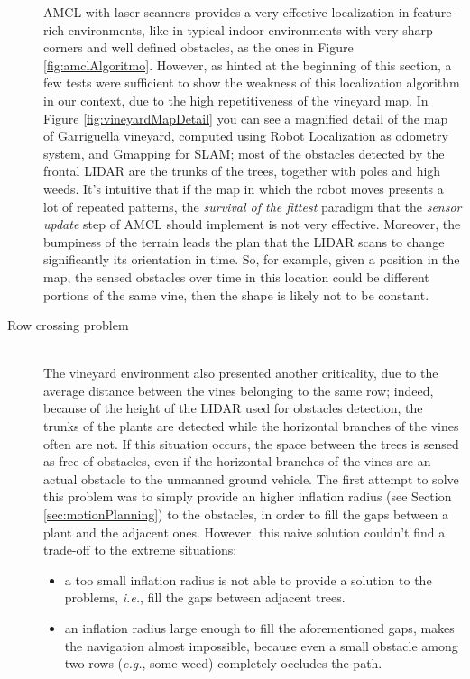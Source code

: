 \begin{description}
\ac{AMCL} with laser scanners provides a very effective localization in feature-rich environments, like in typical indoor environments with very sharp corners and well defined obstacles, as the ones in Figure \ref{fig:amclAlgoritmo}.
However, as hinted at the beginning of this section, a few tests were sufficient to show the weakness of this localization algorithm in our context, due to the high repetitiveness of the vineyard map. In Figure \ref{fig:vineyardMapDetail} you can see a magnified detail of the map of Garriguella vineyard, computed using Robot Localization as odometry system, and Gmapping for \ac{SLAM}; most of the obstacles detected by the frontal \ac{LIDAR} are the trunks of the trees, together with poles and high weeds.
 It's intuitive that if the map in which the robot moves presents a lot of repeated patterns, the \textit{survival of the fittest} paradigm that the \textit{sensor update} step of \ac{AMCL} should implement is not very effective. Moreover, the bumpiness of the terrain leads the plan that the \ac{LIDAR} scans to change significantly its orientation in time. So, for example, given a position in the map, the sensed obstacles over time in this location could be different portions of the same vine, then the shape is likely not to be constant.

\item[Row crossing problem] \hfill \\
The vineyard environment also presented another criticality, due to the average distance between the vines belonging to the same row; indeed, because of the height of the \ac{LIDAR} used for obstacles detection, the trunks of the plants are detected while the horizontal branches of the vines often are not.
If this situation occurs, the space between the trees is sensed as free of obstacles, even if the horizontal branches of the vines are an actual obstacle to the unmanned ground vehicle. The first attempt to solve this problem was to simply provide an higher inflation radius (see Section \ref{sec:motionPlanning}) to the obstacles, in order to fill the gaps between a plant and the adjacent ones. However, this naive solution couldn't find a trade-off to the extreme situations:
\begin{itemize}
	\item a too small inflation radius is not able to provide a solution to the problems, \textit{i.e.}, fill the gaps between adjacent trees.
	\item an inflation radius large enough to fill the aforementioned gaps, makes the navigation almost impossible, because even a small obstacle among two rows (\textit{e.g.}, some weed) completely occludes the path.
\end{itemize}

\end{description}

